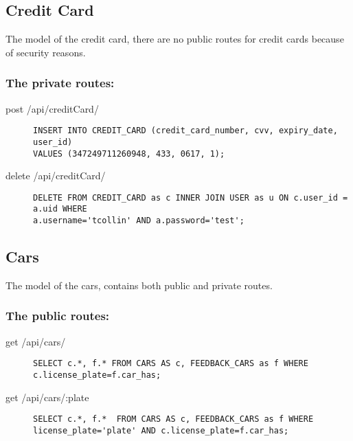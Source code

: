 \documentclass{article}
\begin{document}
\subsection{Credit Card}
The model of the credit card, there are no public routes for credit cards because of security reasons.

\subsubsection{The private routes:}
\begin{description}
\item[post /api/creditCard/] \mbox{}
\begin{lstlisting}
INSERT INTO CREDIT_CARD (credit_card_number, cvv, expiry_date, user_id)
VALUES (347249711260948, 433, 0617, 1);
\end{lstlisting}

\item[delete /api/creditCard/] \mbox{}
\begin{lstlisting}
DELETE FROM CREDIT_CARD as c INNER JOIN USER as u ON c.user_id = a.uid WHERE
a.username='tcollin' AND a.password='test';
\end{lstlisting}
\end{description}

\subsection{Cars}
The model of the cars, contains both public and private routes.
\subsubsection{The public routes:}
\begin{description}
\item[get /api/cars/] \mbox{}
\begin{lstlisting}
SELECT c.*, f.* FROM CARS AS c, FEEDBACK_CARS as f WHERE c.license_plate=f.car_has;
\end{lstlisting}
\item[get /api/cars/:plate] \mbox{}
\begin{lstlisting}
SELECT c.*, f.*  FROM CARS AS c, FEEDBACK_CARS as f WHERE license_plate='plate' AND c.license_plate=f.car_has;
\end{lstlisting}
\end{description}
\end{document}
